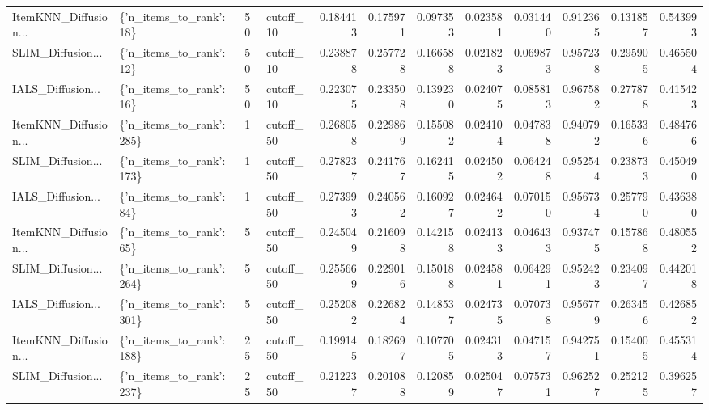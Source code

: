 \begin{tabular}{llllrrrrrrrr}
ItemKNN\_Diffusion... &  \{'n\_items\_to\_rank': 18\} &       50 & cutoff\_10 & 0.184413 &   0.175971 & 0.097353 & 0.023581 &        0.031440 &                   0.912365 &       0.131857 &            0.543993 \\
SLIM\_Diffusion... &  \{'n\_items\_to\_rank': 12\} &       50 & cutoff\_10 & 0.238878 &   0.257728 & 0.166588 & 0.021823 &        0.069873 &                   0.957238 &       0.295905 &            0.465504 \\
IALS\_Diffusion... &  \{'n\_items\_to\_rank': 16\} &       50 & cutoff\_10 & 0.223075 &   0.233508 & 0.139230 & 0.024075 &        0.085813 &                   0.967582 &       0.277878 &            0.415423 \\
ItemKNN\_Diffusion... & \{'n\_items\_to\_rank': 285\} &        1 & cutoff\_50 & 0.268058 &   0.229869 & 0.155082 & 0.024104 &        0.047838 &                   0.940792 &       0.165336 &            0.484766 \\
SLIM\_Diffusion... & \{'n\_items\_to\_rank': 173\} &        1 & cutoff\_50 & 0.278237 &   0.241767 & 0.162415 & 0.024502 &        0.064248 &                   0.952544 &       0.238733 &            0.450490 \\
IALS\_Diffusion... &  \{'n\_items\_to\_rank': 84\} &        1 & cutoff\_50 & 0.273993 &   0.240562 & 0.160927 & 0.024642 &        0.070150 &                   0.956734 &       0.257790 &            0.436380 \\
ItemKNN\_Diffusion... &  \{'n\_items\_to\_rank': 65\} &        5 & cutoff\_50 & 0.245049 &   0.216098 & 0.142158 & 0.024133 &        0.046433 &                   0.937475 &       0.157868 &            0.480552 \\
SLIM\_Diffusion... & \{'n\_items\_to\_rank': 264\} &        5 & cutoff\_50 & 0.255669 &   0.229016 & 0.150188 & 0.024581 &        0.064291 &                   0.952423 &       0.234097 &            0.442018 \\
IALS\_Diffusion... & \{'n\_items\_to\_rank': 301\} &        5 & cutoff\_50 & 0.252082 &   0.226824 & 0.148537 & 0.024735 &        0.070738 &                   0.956779 &       0.263456 &            0.426852 \\
ItemKNN\_Diffusion... & \{'n\_items\_to\_rank': 188\} &       25 & cutoff\_50 & 0.199145 &   0.182697 & 0.107705 & 0.024313 &        0.047157 &                   0.942751 &       0.154005 &            0.455314 \\
SLIM\_Diffusion... & \{'n\_items\_to\_rank': 237\} &       25 & cutoff\_50 & 0.212237 &   0.201088 & 0.120859 & 0.025047 &        0.075731 &                   0.962527 &       0.252125 &            0.396257 \\

\end{tabular}

